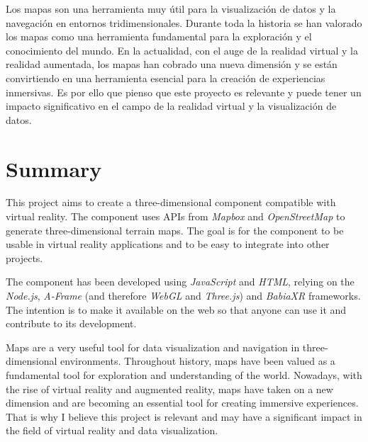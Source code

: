 \documentclass[a4paper, 12pt]{book}
\begin{document}
Los mapas son una herramienta muy útil para la visualización de datos y la
navegación en entornos tridimensionales. Durante toda la historia se han valorado
los mapas como una herramienta fundamental para la exploración y el
conocimiento del mundo. En la actualidad, con el auge de la realidad virtual y la
realidad aumentada, los mapas han cobrado una nueva dimensión y se están convirtiendo
en una herramienta esencial para la creación de experiencias inmersivas. Es por
ello que pienso que este proyecto es relevante y puede tener un impacto
significativo en el campo de la realidad virtual y la visualización de datos.




\chapter*{Summary}

This project aims to create a three-dimensional component compatible
with virtual reality. The component uses APIs from \textit{Mapbox} and \textit{OpenStreetMap} 
to generate three-dimensional terrain maps. The goal is for the component
to be usable in virtual reality applications and to be easy to integrate
into other projects.

The component has been developed using \textit{JavaScript} and \textit{HTML}, relying on
the \textit{Node.js}, \textit{A-Frame} (and therefore \textit{WebGL} and \textit{Three.js}) and \textit{BabiaXR}
frameworks. The intention is to make it available on the web so that anyone can
use it and contribute to its development.

Maps are a very useful tool for data visualization and
navigation in three-dimensional environments. Throughout history, maps have been valued
as a fundamental tool for exploration and
understanding of the world. Nowadays, with the rise of virtual reality and
augmented reality, maps have taken on a new dimension and are becoming
an essential tool for creating immersive experiences. That is
why I believe this project is relevant and may have a significant impact
in the field of virtual reality and data visualization.
\end{document}
